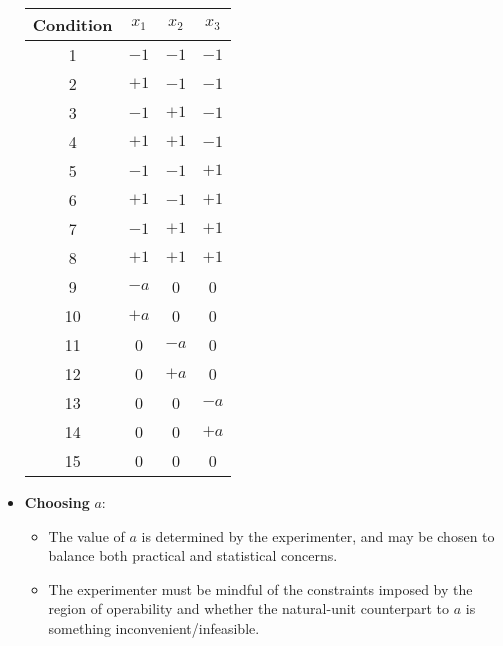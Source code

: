 \begin{itemize}
\begin{table}[!htbp]
\begin{tabular}{ccc}
                  \bottomrule
              \end{tabular}\hfill
              \begin{tabular}{cccc}
                  \toprule Condition & $x_{1}$ & $x_{2}$ & $x_{3}$ \\
                  \midrule 1         & $-1$    & $-1$    & $-1$    \\
                  2                  & $+1$    & $-1$    & $-1$    \\
                  3                  & $-1$    & $+1$    & $-1$    \\
                  4                  & $+1$    & $+1$    & $-1$    \\
                  5                  & $-1$    & $-1$    & $+1$    \\
                  6                  & $+1$    & $-1$    & $+1$    \\
                  7                  & $-1$    & $+1$    & $+1$    \\
                  8                  & $+1$    & $+1$    & $+1$    \\
                  9                  & $-a$    & 0       & 0       \\
                  10                 & $+a$    & 0       & 0       \\
                  11                 & 0       & $-a$    & 0       \\
                  12                 & 0       & $+a$    & 0       \\
                  13                 & 0       & 0       & $-a$    \\
                  14                 & 0       & 0       & $+a$    \\
                  15                 & 0       & 0       & 0       \\
                  \bottomrule
              \end{tabular}
          \end{table}
    \item \textbf{Choosing} $ a $:
          \begin{itemize}
              \item The value of $ a $ is determined by the experimenter, and may be chosen to balance both practical
                    and statistical concerns.
              \item The experimenter must be mindful of the constraints imposed by the region of operability and
                    whether the natural-unit counterpart to $ a $ is something inconvenient/infeasible.

\end{itemize}
\end{itemize}
